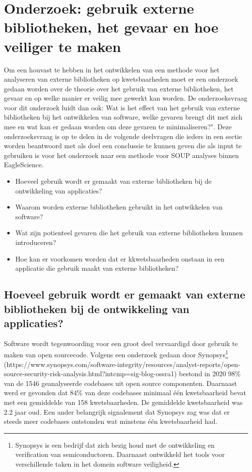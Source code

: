 \chapter{Onderzoek: gebruik externe bibliotheken, het gevaar en hoe veiliger te maken}\label{ch:externeBibliothekengebruikGevaren}
Om een houvast te hebben in het ontwikkelen van een methode voor het analyseren van externe bibliotheken op kwetsbaarheden moet er een onderzoek gedaan worden over de theorie over het gebruik van externe bibliotheken, het gevaar en op welke manier er veilig mee gewerkt kan worden. De onderzoeksvraag voor dit onderzoek luidt dan ook: Wat is het effect van het gebruik van externe bibliotheken bij het ontwikkelen van software, welke gevaren brengt dit met zich mee en wat kan er gedaan worden om deze gevaren te minimaliseren?". Deze onderzoeksvraag is op te delen in de volgende deelvragen die ieders in een sectie worden beantwoord met als doel een conclussie te kunnen geven die als input te gebruiken is voor het onderzoek naar een methode voor SOUP analyses binnen EagleScience.

\begin{itemize}
    \item Hoeveel gebruik wordt er gemaakt van externe bibliotheken bij de ontwikkeling van applicaties?
    \item Waarom worden externe bibliotheken gebruikt in het ontwikkelen van software?
    \item Wat zijn potienteel gevaren die het gebruik van externe bibliotheken kunnen introduceren?
    \item Hoe kan er voorkomen worden dat er kkwetsbaarheden onstaan in een applicatie die gebruik maakt van externe bibliotheken?
\end{itemize}

\section{Hoeveel gebruik wordt er gemaakt van externe bibliotheken bij de ontwikkeling van applicaties?}\label{sec:hoeveel-gebruik-wordt-er-gemaakt-van-externe-bibliotheken-bij-de-ontwikkeling-van-applicaties?}
Software wordt tegenwoording voor een groot deel vervaardigd door gebruik te maken van open source\-code. Volgens een onderzoek gedaan door Synopsys\footnote{Synopsys is een bedrijf dat zich bezig houd met de ontwikkeling en verification van semiconductoren. Daarnaast ontwikkeld het tools voor verschillende taken in het domein software veiligheid. } (https://www.synopsys.com/software-integrity/resources/analyst-reports/open-source-security-risk-analysis.html?intcmp=sig-blog-ossra1) bestond in 2020 98\% van de 1546 geanalyseerde codebases uit open source componenten. Daarnaast werd er gevonden dat 84\% van deze codebases minimaal één kwetsbaarheid bevat met een gemiddelde van 158 kwetsbaarheden. De gemiddelde kwetsbaarheid was 2.2 jaar oud. Een ander belangrijk signalement dat Synopsys zag was dat er steeds meer codebases ontstonden wat minstens één kwetsbaarheid had.

